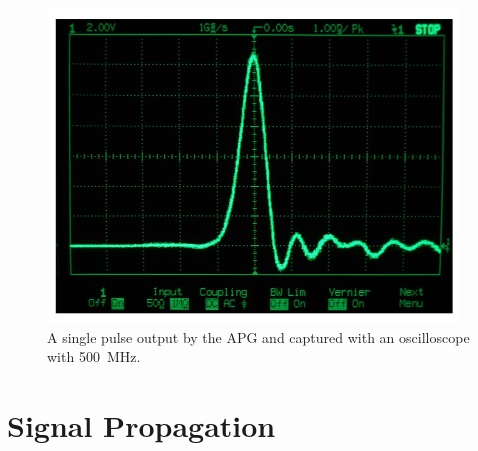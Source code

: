     \begin{figure}[H]
        \centering
        \includegraphics[width=.4\textwidth]{messdaten/500mhz_waveform.jpg}
        \caption[Pulse captured with a \SI{500}{MHz} oscilloscope]{A single pulse output by the APG and captured with an oscilloscope with \SI{500}{MHz}.}
        \label{fig:500MHz_waveform}
    \end{figure}
\section{Signal Propagation}
%
